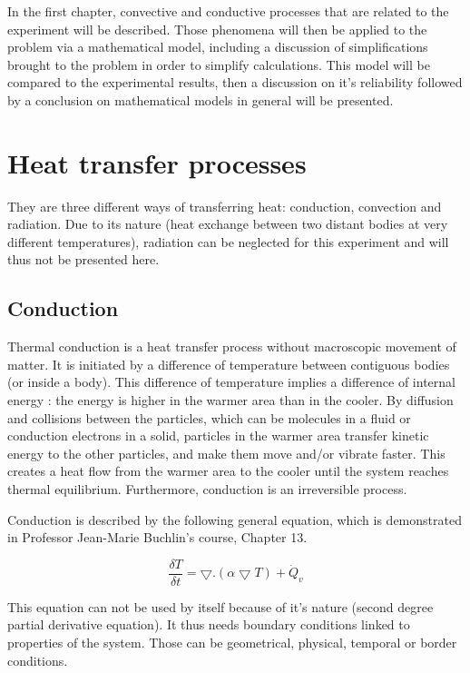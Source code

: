 \documentclass{report}
\begin{document}
	In the first chapter, convective and conductive processes that are related to the experiment will be described. Those phenomena will then be applied to the problem via a mathematical model, including a discussion of simplifications brought to the problem in order to simplify calculations. This model will be compared to the experimental results, then a discussion on it's reliability followed by a conclusion on mathematical models in general will be presented.
	
	\chapter{Heat transfer processes}\label{htp}
	
	They are three different ways of transferring heat: conduction, convection and radiation. Due to its nature (heat exchange between two distant bodies at very different temperatures), radiation can be neglected for this experiment and will thus not be presented here.
	
	\section{Conduction}\label{cd}
	
	Thermal conduction is a heat transfer process without macroscopic movement of matter. It is initiated by a difference of temperature between contiguous bodies (or inside a body). This difference of temperature implies a difference of internal energy : the energy is higher in the warmer area than in the cooler. By diffusion and collisions between the particles, which can be molecules in a fluid or conduction electrons in a solid, particles in the warmer area transfer kinetic energy to the other particles, and make them move and/or vibrate faster. This creates a heat flow from the warmer area to the cooler until the system reaches thermal equilibrium. Furthermore, conduction is an irreversible process.
	
	Conduction is described by the following general equation, which is demonstrated in Professor Jean-Marie Buchlin's course\cite{Buchlin}, Chapter 13.
	
	\begin{equation}
		\frac{\delta T}{\delta t} = \bigtriangledown . (\alpha \bigtriangledown T)+ \dot{Q}_v
	\end{equation}
	
	This equation can not be used by itself because of it's nature (second degree partial derivative equation). It thus needs boundary conditions linked to properties of the system. Those can be geometrical, physical, temporal or border conditions.
	
\end{document}
